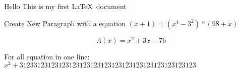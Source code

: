 \documentclass[12pt]{article}
\begin{document}
Hello This is my first \LaTeX\ document

Create New Paragraph with a equation $(x+1) = (x^4-3^2)*(98 + x)$

$$A(x)=x^2+3x-76$$ 

For all equation in one line: ${x^2+31233123123123123123123123123123123123123123123123}$
\end{document}
